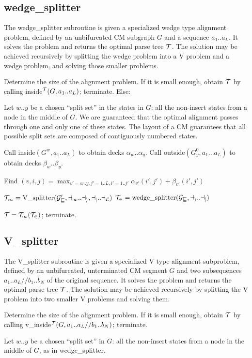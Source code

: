 \documentclass[11pt]{article}
\begin{document}
\subsection{wedge\_splitter}

The wedge\_splitter subroutine is given a specialized wedge type
alignment problem, defined by an unbifurcated CM subgraph $G$ and a
sequence $a_1..a_L$. It solves the problem and returns the optimal
parse tree $\cal{T}$. The solution may be achieved recursively by
splitting the wedge problem into a V problem and a wedge problem, and
solving those smaller problems.

Determine the size of the alignment problem. If it is small enough,
obtain $\cal{T}$ by calling inside$^{\cal{T}}(G, a_1..a_L)$;
terminate. Else:

Let $w..y$ be a chosen ``split set'' in the states in $G$: all the
non-insert states from a node in the middle of $G$. We are guaranteed
that the optimal alignment passes through one and only one of these
states. The layout of a CM guarantees that all possible split sets are
composed of contiguously numbered states.

Call inside$(G^w, a_1..a_L)$ to obtain decks $\alpha_w..\alpha_y$.  
Call outside$(G^0_y, a_1...a_L)$ to obtain decks $\beta_w..\beta_y$.

Find $(v,i,j) = \max_{v'=w..y, j'=1..L, i'=1..j'} \alpha_{v'}(i',j') + \beta_{v'}(i',j')$

$\cal{T}_1 = \mbox{V\_splitter}(G^0_v, a_1..a_i, a_j..a_L)$
$\cal{T}_2 = \mbox{wedge\_splitter}(G_v, a_i..a_j)$

$\cal{T} = \cal{T}_1 (\cal{T}_2)$; terminate.

\subsection{V\_splitter}

The V\_splitter subroutine is given a specialized V type alignment
subproblem, defined by an unbifurcated, unterminated CM segment $G$
and two subsequences $a_1..a_L//b_1..b_N$ of the original sequence. It
solves the problem and returns the optimal parse tree $\cal{T}$. The
solution may be achieved recursively by splitting the V problem into
two smaller V problems and solving them.

Determine the size of the alignment problem. If it is small enough,
obtain $\cal{T}$ by calling v\_inside$^{\cal{T}}(G, a_1..a_L//b_1..b_N)$;
terminate.

Let $w..y$ be a chosen ``split set'' in $G$: all the non-insert states
from a node in the middle of $G$, as in wedge\_splitter.
\end{document}

